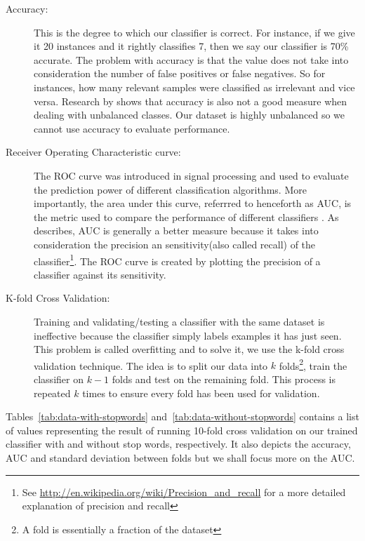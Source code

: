 \begin{description}
  \item[Accuracy:] This is the degree to which our classifier is correct. For instance, if we give
    it 20 instances and it rightly classifies 7, then we say our classifier is 70\% accurate. The
    problem with accuracy is that the value does not take into consideration the number of false
    positives or false negatives. So for instances, how many relevant samples were classified as
    irrelevant and vice versa. Research  by \citet{ling2003auc} shows that accuracy is also not a
    good measure when dealing with unbalanced classes. Our dataset is highly unbalanced so we cannot
    use accuracy to evaluate performance.

  \item[Receiver Operating Characteristic curve:] The ROC curve was introduced in signal processing
    and used to evaluate the prediction power of different classification algorithms. More
    importantly, the area under this curve, referrred to henceforth as AUC, is the metric used to
    compare the performance of different classifiers \citep{bradley1997use}. As \citet{ling2003auc}
    describes, AUC is generally a better measure because it takes into consideration the precision
    an sensitivity(also called recall) of the classifier\footnote{See
      \url{http://en.wikipedia.org/wiki/Precision_and_recall} for a more detailed explanation of
    precision and recall}. The ROC curve is created by plotting the precision of a classifier
    against its sensitivity.

  \item[K-fold Cross Validation:] Training and validating/testing a classifier with the same dataset
    is ineffective because the classifier simply labels examples it has just seen. This problem is
    called overfitting and to solve it, we use the k-fold cross validation technique. The idea is to
    split our data into $k$ folds\footnote{A fold is essentially a fraction of the dataset}, train
    the classifier on $k-1$ folds and test on the remaining fold. This process is repeated $k$ times
    to ensure every fold has been used for validation.
\end{description}

Tables~\ref{tab:data-with-stopwords} and~\ref{tab:data-without-stopwords} contains a list of values
representing the result of running 10-fold cross validation on our trained classifier with and
without stop words, respectively. It also depicts the accuracy, AUC and standard deviation between
folds but we shall focus more on the AUC.

